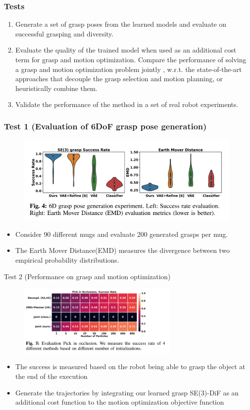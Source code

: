 \documentclass{beamer}
\begin{document}
\begin{frame}\frametitle{Tests}
\begin{enumerate}
\item Generate a set of grasp poses from the
learned models and evaluate on successful grasping and diversity. 
\item Evaluate the quality of the trained model
when used as an additional cost term for grasp and motion
optimization. Compare the performance of
solving a grasp and motion optimization problem jointly
, w.r.t. the state-of-the-art approaches that decouple the grasp selection and motion planning, or heuristically combine them.
\item Validate the performance of the method in a set of real robot experiments.
\end{enumerate}
\end{frame}


\begin{frame}\frametitle{Test 1 (Evaluation of 6DoF grasp pose generation)}
\begin{figure}
\includegraphics[width=.8\linewidth]{results.png}
\end{figure}
\begin{itemize}
    \item Consider 90 different mugs and evaluate 200
    generated grasps per mug.
    \item The Earth Mover Distance(EMD) measures the divergence
between two empirical probability distributions.
\end{itemize}
\end{frame}


\begin{frame}{Test 2 (Performance on grasp and motion optimization)}
\begin{figure}
    \includegraphics[width=8cm]{results_grasp_with_motion.png}
\end{figure}
    \begin{itemize}
        \item The success is measured based on the robot being
            able to grasp the object at the end of the execution
    \item Generate the trajectories by integrating our
        learned grasp SE(3)-DiF as an additional cost function to
        the motion optimization objective function
    \end{itemize}
\end{frame}
\end{document}
